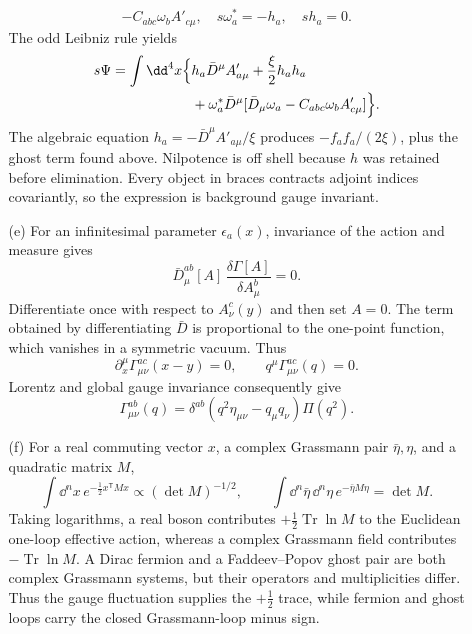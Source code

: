 \begin{enumerate}
\begin{enumerate}
\[         -C_{abc}\omega_b A'_{c\mu},\quad
      s\omega_a^*=-h_a,\quad sh_a=0 .
    \]
    The odd Leibniz rule yields
    \[
    \begin{split}
      s\Psi=\int \dd^4x\Bigl\{&
        h_a\bar D^\mu A'_{a\mu}
        +\frac{\xi}{2}h_a h_a\\
        &+\omega_a^*\bar D^\mu[
          \bar D_\mu\omega_a
          -C_{abc}\omega_b A'_{c\mu}]
        \Bigr\}.
    \end{split}
    \]
    The algebraic equation
    \(h_a=-\bar D^\mu A'_{a\mu}/\xi\) produces
    \(-f_a f_a/(2\xi)\), plus the ghost term found above.
    Nilpotence is off shell because \(h\) was retained before elimination.
    Every object in braces contracts adjoint indices covariantly, so the
    expression is background gauge invariant.
    \item[(e)]
    For an infinitesimal parameter \(\epsilon_a(x)\), invariance of the
    action and measure gives
    \[
      \boxed{\bar D_\mu^{ab}[A]\,
         \frac{\delta\Gamma[A]}{\delta A_\mu^b}=0.}
    \]
    Differentiate once with respect to \(A_\nu^c(y)\) and then set
    \(A=0\).  The term obtained by differentiating \(\bar D\) is
    proportional to the one-point function, which vanishes in a symmetric
    vacuum.  Thus
    \[
      \partial_x^\mu\Gamma_{\mu\nu}^{ac}(x-y)=0,
      \qquad
      q^\mu\Gamma_{\mu\nu}^{ac}(q)=0 .
    \]
    Lorentz and global gauge invariance consequently give
    \[
      \Gamma_{\mu\nu}^{ab}(q)
        =\delta^{ab}
         (q^2\eta_{\mu\nu}-q_\mu q_\nu)\Pi(q^2).
    \]
    \item[(f)]
    For a real commuting vector \(x\), a complex Grassmann pair
    \(\bar\eta,\eta\), and a quadratic matrix \(M\),
    \[
      \int \dd^nx\,e^{-\frac12x^{\mathsf T}Mx}
        \propto(\det M)^{-1/2},\qquad
      \int \dd^n\bar\eta\,\dd^n\eta\,e^{-\bar\eta M\eta}
        =\det M .
    \]
    Taking logarithms, a real boson contributes
    \(+\tfrac12\operatorname{Tr}\ln M\) to the Euclidean one-loop effective
    action, whereas a complex Grassmann field contributes
    \(-\operatorname{Tr}\ln M\).  A Dirac fermion and a Faddeev--Popov ghost
    pair are both complex Grassmann systems, but their operators and
    multiplicities differ.  Thus the gauge fluctuation supplies the
    \(+\tfrac12\) trace, while fermion and ghost loops carry the closed
    Grassmann-loop minus sign.
  \end{enumerate}


\end{enumerate}
